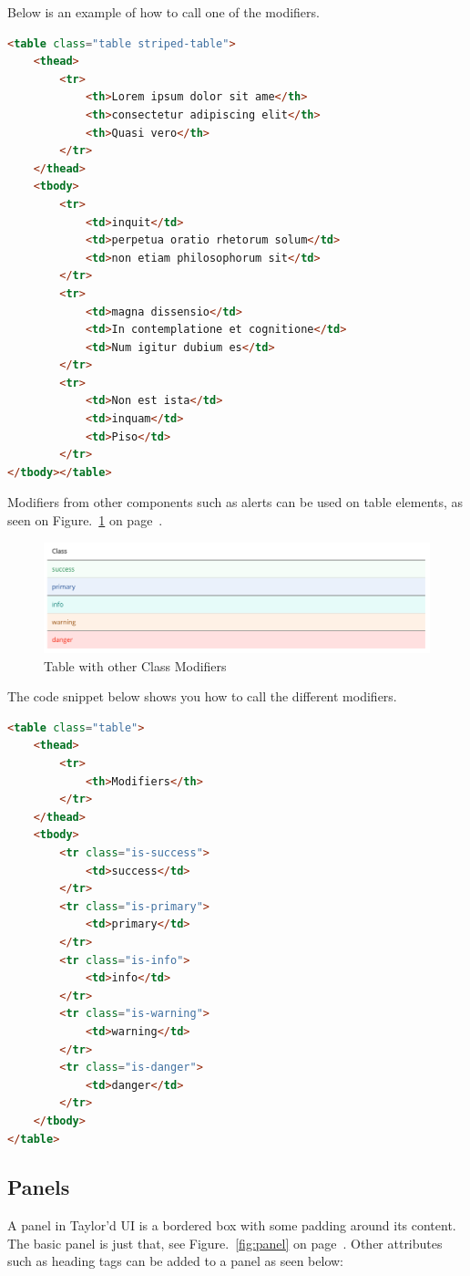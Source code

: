 Below is an example of how to call one of the modifiers. 

\begin{lstlisting}[language=HTML]
<table class="table striped-table">
	<thead>
		<tr>
			<th>Lorem ipsum dolor sit ame</th>
			<th>consectetur adipiscing elit</th>
			<th>Quasi vero</th>
		</tr>
	</thead>
	<tbody>
		<tr>
			<td>inquit</td>
			<td>perpetua oratio rhetorum solum</td>
			<td>non etiam philosophorum sit</td>
		</tr>
		<tr>
			<td>magna dissensio</td>
			<td>In contemplatione et cognitione</td>
			<td>Num igitur dubium es</td>
		</tr>
		<tr>
			<td>Non est ista</td>
			<td>inquam</td>
			<td>Piso</td>
		</tr>
</tbody></table>
\end{lstlisting}


\newpage
Modifiers from other components such as alerts can be used on table elements, as seen on Figure.~\ref{fig:tableClass} on  page~\pageref{fig:tableClass}. 

\begin{figure}[h]
\centering
  \includegraphics[scale=0.2]{images/tableClass}
\caption{Table with other Class Modifiers}
  \label{fig:tableClass}
\end{figure}

The code snippet below shows you how to call the different modifiers. 

\begin{lstlisting}[language=HTML]
<table class="table">
	<thead>
		<tr>
			<th>Modifiers</th>
		</tr>
	</thead>
	<tbody>
		<tr class="is-success">
			<td>success</td>
		</tr>
		<tr class="is-primary">
			<td>primary</td>
		</tr>
		<tr class="is-info">
			<td>info</td>
		</tr>
		<tr class="is-warning">
			<td>warning</td>
		</tr>
		<tr class="is-danger">
			<td>danger</td>
		</tr>
	</tbody>
</table>
\end{lstlisting}

\newpage
\subsection*{Panels}
A panel in Taylor'd UI is a bordered box with some padding around its content. The basic panel is just that, see Figure.~\ref{fig:panel} on  page~\pageref{fig:panel}. Other attributes such as heading tags can be added to a panel as seen below: 

